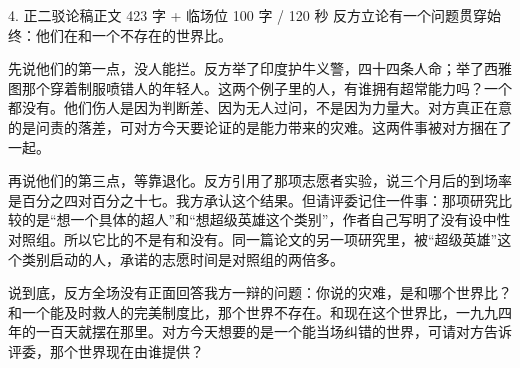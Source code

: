 \documentclass[script,pro]{debate}
\begin{document}
\begin{speech}{4. 正二驳论稿}{正文 423 字 + 临场位 100 字 / 120 秒}
反方立论有一个问题贯穿始终：他们在和一个不存在的世界比。

先说他们的第一点，没人能拦。反方举了印度护牛义警，四十四条人命；举了西雅图那个穿着制服喷错人的年轻人。这两个例子里的人，有谁拥有超常能力吗？一个都没有。他们伤人是因为判断差、因为无人过问，不是因为力量大。对方真正在意的是问责的落差，可对方今天要论证的是能力带来的灾难。这两件事被对方捆在了一起。

再说他们的第三点，等靠退化。反方引用了那项志愿者实验，说三个月后的到场率是百分之四对百分之十七。我方承认这个结果。但请评委记住一件事：那项研究比较的是“想一个具体的超人”和“想超级英雄这个类别”，作者自己写明了没有设中性对照组。所以它比的不是有和没有。同一篇论文的另一项研究里，被“超级英雄”这个类别启动的人，承诺的志愿时间是对照组的两倍多。

说到底，反方全场没有正面回答我方一辩的问题：你说的灾难，是和哪个世界比？和一个能及时救人的完美制度比，那个世界不存在。和现在这个世界比，一九九四年的一百天就摆在那里。对方今天想要的是一个能当场纠错的世界，可请对方告诉评委，那个世界现在由谁提供？

\begin{contingency}
\end{contingency}
\end{speech}
\end{document}
